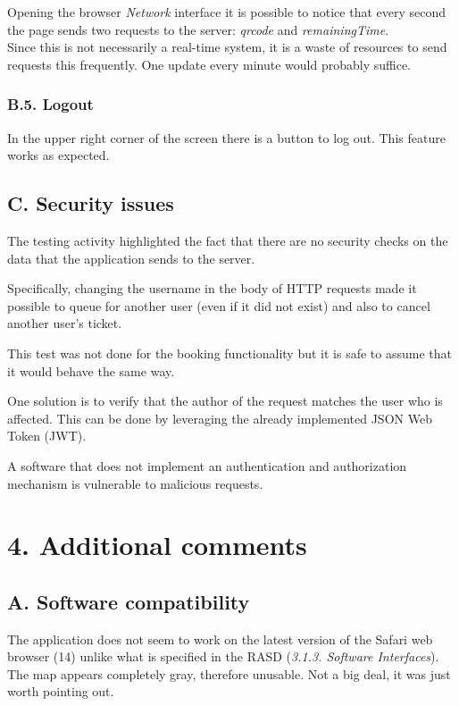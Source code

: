 Opening the browser \emph{Network} interface it is possible to notice that every second the page sends two requests to the server: \emph{qrcode} and \emph{remainingTime}.\\
Since this is not necessarily a real-time system, it is a waste of resources to send requests this frequently. One update every minute would probably suffice.

\subsection{B.5. Logout}

In the upper right corner of the screen there is a button to log out. This feature works as expected.

\clearpage
\section{C. Security issues}

The testing activity highlighted the fact that there are no security checks on the data that the application sends to the server.

Specifically, changing the username in the body of HTTP requests made it possible to queue for another user (even if it did not exist) and also to cancel another user's ticket.

This test was not done for the booking functionality but it is safe to assume that it would behave the same way.

One solution is to verify that the author of the request matches the user who is affected. 
This can be done by leveraging the already implemented JSON Web Token (JWT).

A software that does not implement an authentication and authorization mechanism is vulnerable to malicious requests.

\chapter{4. Additional comments}

\section{A. Software compatibility}

The application does not seem to work on the latest version of the Safari web browser (14) unlike what is specified in the RASD (\emph{3.1.3. Software Interfaces}).\\
The map appears completely gray, therefore unusable. Not a big deal, it was just worth pointing out.

